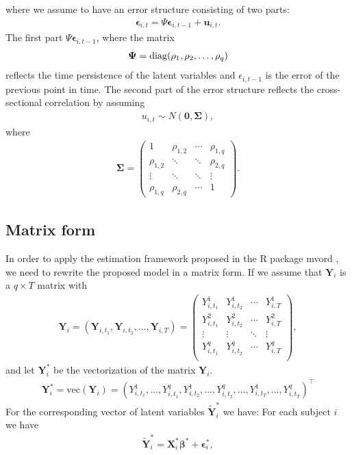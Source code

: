 \documentclass{article}
\newcommand{\pkg}[1]{{\normalfont\fontseries{b}\selectfont #1}}
\let\proglang=\textsf
\DeclarePairedDelimiter{\diagfences}{(}{)}
\newcommand{\diag}{\operatorname{diag}\diagfences}
\begin{document}
where we assume to have an error structure consisting of two parts:
\begin{align*}
 \bm  \epsilon_{i,t} = \Psi \bm \epsilon_{i, t-1} + \bm u_{i,t}.
\end{align*}
The first part $\Psi \bm \epsilon_{i, t-1}$, where the matrix
  \begin{align*}
  \bm \Psi =  \diag{\rho_1, \rho_2, \ldots, \rho_{q}}
\end{align*}
reflects the time persistence of the latent variables and $\epsilon_{i, t-1}$ is the error of the previous point in time. The second part of the error structure reflects the cross-sectional correlation by assuming
\begin{align*}
  u_{i,t} \sim N(\bm 0, \bm\Sigma),
\end{align*}
where
  \begin{align*}
  \bm \Sigma = \begin{pmatrix} 1 & \rho_{1,2} & \cdots & \rho_{1,q}\\
  \rho_{1,2}& \ddots & \ddots & \rho_{2,q}\\
  \vdots & \ddots & \ddots & \vdots\\
  \rho_{1,q}&  \rho_{2,q}& \cdots & 1
  \end{pmatrix}.
\end{align*}






\subsection{Matrix form}
In order to apply the estimation framework proposed in the \proglang{R} package \pkg{mvord} \citep{pub:mvord:Hirk+Hornik+Vana:2020}, we need to rewrite the proposed model in a matrix form. If we assume that $\bm Y_i$ is a $q \times T$ matrix with
\begin{align*}
\bm Y_i =  (\bm Y_{i,t_1}, \bm Y_{i,t_2}, \ldots, \bm Y_{i,T}) = \begin{pmatrix}
Y_{i,t_1}^1 & Y_{i,t_2}^1 & \cdots &  Y_{i,T}^1\\
Y_{i,t_1}^2 & Y_{i,t_2}^2 & \cdots &  Y_{i,T}^2\\
\vdots & \vdots & \ddots & \vdots\\
Y_{i,t_1}^q & Y_{i,t_2}^q & \cdots &  Y_{i,T}^q\\
\end{pmatrix},
\end{align*}
and let $\bm Y_i^*$ be the vectorization of the matrix $\bm Y_i$.
\begin{align*}
\bm Y_i^* = \text{vec}(\bm Y_i) =  (Y_{i,t_1}^1, \ldots,  Y_{i,t_1}^{q}, Y_{i,t_2}^1, \ldots, Y_{i,t_2}^{q},  \ldots, Y_{i,t_T}^1, \ldots,  Y_{i,t_T}^{q})^\top
\end{align*}
For the corresponding vector of latent variables $\bm {\tilde Y}_{i}^*$ we have:
For each subject $i$ we have
\begin{align}\label{eqn:mvord}
  \bm {\tilde Y}_{i}^* =  \bm{X}_{i}^{*} \bm \beta^{*} + \bm \epsilon_{i}^*,
\end{align}
\end{document}
